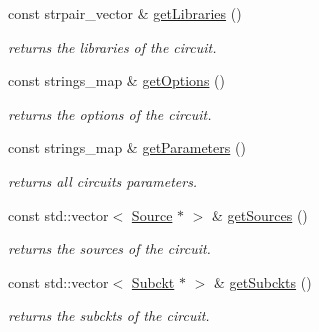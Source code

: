\begin{DoxyCompactItemize}
const strpair\+\_\+vector \& \mbox{\hyperlink{class_s_p_i_c_e_1_1_circuit_a3e6a71a711e4796470f1a2a1dc42aef6}{get\+Libraries}} ()
\begin{DoxyCompactList}\small\item\em returns the libraries of the circuit. \end{DoxyCompactList}\item 
\mbox{\label{class_s_p_i_c_e_1_1_circuit_a4ee11ef79ef893c5621e0e7d26a7f9a7}} 
const strings\+\_\+map \& \mbox{\hyperlink{class_s_p_i_c_e_1_1_circuit_a4ee11ef79ef893c5621e0e7d26a7f9a7}{get\+Options}} ()
\begin{DoxyCompactList}\small\item\em returns the options of the circuit. \end{DoxyCompactList}\item 
const strings\+\_\+map \& \mbox{\hyperlink{class_s_p_i_c_e_1_1_circuit_a4c46676f9ead2db537a0dd963b4f08f1}{get\+Parameters}} ()
\begin{DoxyCompactList}\small\item\em returns all circuit\textquotesingle{}s parameters. \end{DoxyCompactList}\item 
\mbox{\label{class_s_p_i_c_e_1_1_circuit_ac18caa525ed386c44874ee643c88e27b}} 
const std\+::vector$<$ \mbox{\hyperlink{class_s_p_i_c_e_1_1_source}{Source}} $\ast$ $>$ \& \mbox{\hyperlink{class_s_p_i_c_e_1_1_circuit_ac18caa525ed386c44874ee643c88e27b}{get\+Sources}} ()
\begin{DoxyCompactList}\small\item\em returns the sources of the circuit. \end{DoxyCompactList}\item 
\mbox{\label{class_s_p_i_c_e_1_1_circuit_adcc4ca0de68f8ee05f0d5db3b7604930}} 
const std\+::vector$<$ \mbox{\hyperlink{class_s_p_i_c_e_1_1_subckt}{Subckt}} $\ast$ $>$ \& \mbox{\hyperlink{class_s_p_i_c_e_1_1_circuit_adcc4ca0de68f8ee05f0d5db3b7604930}{get\+Subckts}} ()
\begin{DoxyCompactList}\small\item\em returns the subckts of the circuit. \end{DoxyCompactList}\item 
\mbox{\label{class_s_p_i_c_e_1_1_circuit_ad19721dd878c04c854a72af12d785741}} 

\end{DoxyCompactItemize}
